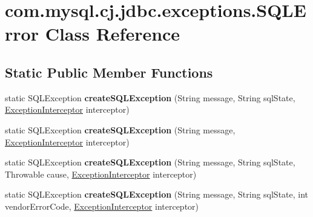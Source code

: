 \hypertarget{classcom_1_1mysql_1_1cj_1_1jdbc_1_1exceptions_1_1_s_q_l_error}{}\section{com.\+mysql.\+cj.\+jdbc.\+exceptions.\+S\+Q\+L\+Error Class Reference}
\label{classcom_1_1mysql_1_1cj_1_1jdbc_1_1exceptions_1_1_s_q_l_error}
\subsection*{Static Public Member Functions}
\begin{DoxyCompactItemize}
\item 
\mbox{\label{classcom_1_1mysql_1_1cj_1_1jdbc_1_1exceptions_1_1_s_q_l_error_a4a4abbc46fa81c8180b80d304d6b8cd7}} 
static S\+Q\+L\+Exception {\bfseries create\+S\+Q\+L\+Exception} (String message, String sql\+State, \mbox{\hyperlink{interfacecom_1_1mysql_1_1cj_1_1exceptions_1_1_exception_interceptor}{Exception\+Interceptor}} interceptor)
\item 
\mbox{\label{classcom_1_1mysql_1_1cj_1_1jdbc_1_1exceptions_1_1_s_q_l_error_a4247d542356478b0ebffa130046e2410}} 
static S\+Q\+L\+Exception {\bfseries create\+S\+Q\+L\+Exception} (String message, \mbox{\hyperlink{interfacecom_1_1mysql_1_1cj_1_1exceptions_1_1_exception_interceptor}{Exception\+Interceptor}} interceptor)
\item 
\mbox{\label{classcom_1_1mysql_1_1cj_1_1jdbc_1_1exceptions_1_1_s_q_l_error_a34308dfb92347b11268a7df69a6c49ea}} 
static S\+Q\+L\+Exception {\bfseries create\+S\+Q\+L\+Exception} (String message, String sql\+State, Throwable cause, \mbox{\hyperlink{interfacecom_1_1mysql_1_1cj_1_1exceptions_1_1_exception_interceptor}{Exception\+Interceptor}} interceptor)
\item 
\mbox{\label{classcom_1_1mysql_1_1cj_1_1jdbc_1_1exceptions_1_1_s_q_l_error_a090e5fb59c357636790ec59e0fc60b0e}} 
static S\+Q\+L\+Exception {\bfseries create\+S\+Q\+L\+Exception} (String message, String sql\+State, int vendor\+Error\+Code, \mbox{\hyperlink{interfacecom_1_1mysql_1_1cj_1_1exceptions_1_1_exception_interceptor}{Exception\+Interceptor}} interceptor)

\end{DoxyCompactItemize}
